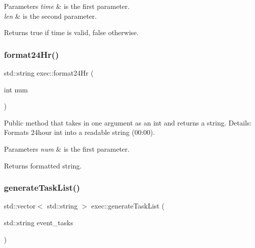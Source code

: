 \begin{DoxyParams}{Parameters}
{\em time} & is the first parameter. \\
\hline
{\em len} & is the second parameter. \\
\hline
\end{DoxyParams}
\begin{DoxyReturn}{Returns}
true if time is valid, false otherwise. 
\end{DoxyReturn}
\mbox{\label{classexec_a24a4ca6c8f63a73ed38ddc8e9d015c46}} 
\subsubsection{\texorpdfstring{format24\+Hr()}{format24Hr()}}
{\footnotesize\ttfamily std\+::string exec\+::format24\+Hr (\begin{DoxyParamCaption}\item[{int}]{num }\end{DoxyParamCaption})}

Public method that takes in one argument as an int and returns a string. Details\+: Formats 24hour int into a readable string (00\+:00). 
\begin{DoxyParams}{Parameters}
{\em num} & is the first parameter. \\
\hline
\end{DoxyParams}
\begin{DoxyReturn}{Returns}
formatted string. 
\end{DoxyReturn}
\mbox{\label{classexec_a056e0f55ae4c4661f7485fe8fc221210}} 
\subsubsection{\texorpdfstring{generate\+Task\+List()}{generateTaskList()}}
{\footnotesize\ttfamily std\+::vector$<$ std\+::string $>$ exec\+::generate\+Task\+List (\begin{DoxyParamCaption}\item[{std\+::string}]{event\+\_\+tasks }\end{DoxyParamCaption})}


